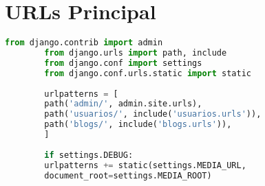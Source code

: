 \documentclass[11pt,a4paper]{report}
\begin{document}
	\section{URLs Principal}
	\begin{lstlisting}[language=python]
		from django.contrib import admin
		from django.urls import path, include
		from django.conf import settings
		from django.conf.urls.static import static
		
		urlpatterns = [
		path('admin/', admin.site.urls),
		path('usuarios/', include('usuarios.urls')),
		path('blogs/', include('blogs.urls')),  
		]
		
		if settings.DEBUG:
		urlpatterns += static(settings.MEDIA_URL, 
		document_root=settings.MEDIA_ROOT)
	\end{lstlisting}
	
\end{document}
